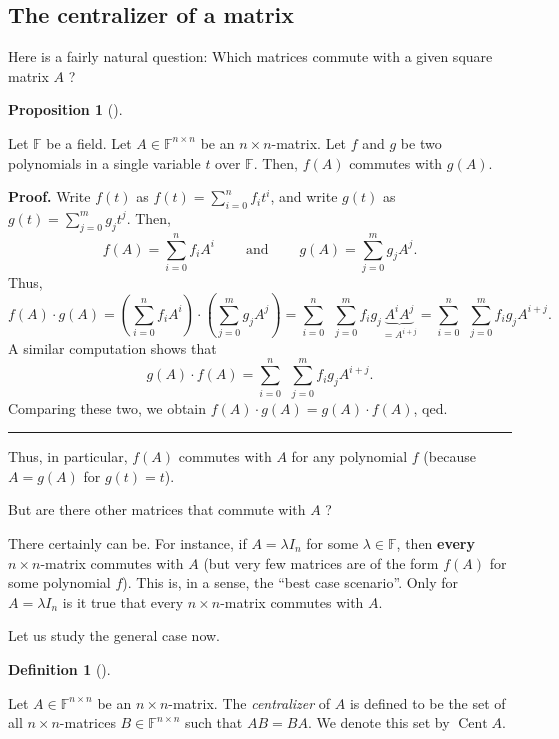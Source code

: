 \documentclass[numbers=enddot,12pt,final,onecolumn,notitlepage]{scrartcl}%
\numberwithin{exer}{subsection}
\theoremstyle{definition}
\newtheorem{prop}[theo]{Proposition}
\newenvironment{proposition}[1][]
{\begin{prop}[#1]\begin{leftbar}}
{\end{leftbar}\end{prop}}
\newtheorem{defi}[theo]{Definition}
\newenvironment{definition}[1][]
{\begin{defi}[#1]\begin{leftbar}}
{\end{leftbar}\end{defi}}
\newenvironment{proof}[1][Proof]{\noindent\textbf{#1.} }{\ \rule{0.5em}{0.5em}}
\let\sumnonlimits\sum
\renewcommand{\sum}{\sumnonlimits\limits}
\begin{document}
\subsection{The centralizer of a matrix}

Here is a fairly natural question: Which matrices commute with a given square
matrix $A$ ?

\begin{proposition}
Let $\mathbb{F}$ be a field. Let $A\in\mathbb{F}^{n\times n}$ be an $n\times
n$-matrix. Let $f$ and $g$ be two polynomials in a single variable $t$ over
$\mathbb{F}$. Then, $f\left(  A\right)  $ commutes with $g\left(  A\right)  $.
\end{proposition}

\begin{proof}
Write $f\left(  t\right)  $ as $f\left(  t\right)  =\sum_{i=0}^{n}f_{i}t^{i}$,
and write $g\left(  t\right)  $ as $g\left(  t\right)  =\sum_{j=0}^{m}%
g_{j}t^{j}$. Then,%
\[
f\left(  A\right)  =\sum_{i=0}^{n}f_{i}A^{i}\ \ \ \ \ \ \ \ \ \ \text{and}%
\ \ \ \ \ \ \ \ \ \ g\left(  A\right)  =\sum_{j=0}^{m}g_{j}A^{j}.
\]
Thus,%
\[
f\left(  A\right)  \cdot g\left(  A\right)  =\left(  \sum_{i=0}^{n}f_{i}%
A^{i}\right)  \cdot\left(  \sum_{j=0}^{m}g_{j}A^{j}\right)  =\sum_{i=0}%
^{n}\ \ \sum_{j=0}^{m}f_{i}g_{j}\underbrace{A^{i}A^{j}}_{=A^{i+j}}=\sum
_{i=0}^{n}\ \ \sum_{j=0}^{m}f_{i}g_{j}A^{i+j}.
\]
A similar computation shows that%
\[
g\left(  A\right)  \cdot f\left(  A\right)  =\sum_{i=0}^{n}\ \ \sum_{j=0}%
^{m}f_{i}g_{j}A^{i+j}.
\]
Comparing these two, we obtain $f\left(  A\right)  \cdot g\left(  A\right)
=g\left(  A\right)  \cdot f\left(  A\right)  $, qed.
\end{proof}

Thus, in particular, $f\left(  A\right)  $ commutes with $A$ for any
polynomial $f$ (because $A=g\left(  A\right)  $ for $g\left(  t\right)  =t$).

But are there other matrices that commute with $A$ ?

There certainly can be. For instance, if $A=\lambda I_{n}$ for some
$\lambda\in\mathbb{F}$, then \textbf{every} $n\times n$-matrix commutes with
$A$ (but very few matrices are of the form $f\left(  A\right)  $ for some
polynomial $f$). This is, in a sense, the \textquotedblleft best case
scenario\textquotedblright. Only for $A=\lambda I_{n}$ is it true that every
$n\times n$-matrix commutes with $A$.

Let us study the general case now.

\begin{definition}
Let $A\in\mathbb{F}^{n\times n}$ be an $n\times n$-matrix. The
\emph{centralizer} of $A$ is defined to be the set of all $n\times n$-matrices
$B\in\mathbb{F}^{n\times n}$ such that $AB=BA$. We denote this set by
$\operatorname*{Cent}A$.
\end{definition}
\end{document}
